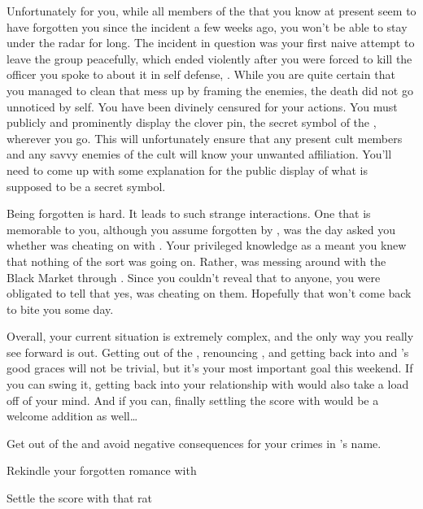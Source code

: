 \documentclass[char]{GL2020}
\begin{document}
Unfortunately for you, while all members of the \pGoaties{} that you know at present seem to have forgotten you since the incident a few weeks ago, you won’t be able to stay under the radar for long. The incident in question was your first naive attempt to leave the group peacefully, which ended violently after you were forced to kill the officer you spoke to about it in self defense, \cJoeKill{}. While you are quite certain that you managed to clean that mess up by framing the \pGoaties{} enemies, the death did not go unnoticed by \cGenesis{} \cGenesis{\them}self. You have been divinely censured for your actions. You must publicly and prominently display the clover pin, the secret symbol of the \pGoaties{}, wherever you go. This will unfortunately ensure that any present cult members and any savvy enemies of the cult will know your unwanted affiliation. You’ll need to come up with some explanation for the public display of what is supposed to be a secret symbol.

Being forgotten is hard. It leads to such strange interactions. One that is memorable to you, although you assume forgotten by \cLibrarian{\them}, was the day \cLibrarian{} asked you whether \cEthics{} was cheating on \cLibrarian{} with \cChupSecond{}. Your privileged knowledge as a \pGoatie{} meant you knew that nothing of the sort was going on. Rather, \cEthics{} was messing around with the Black Market through \cChupSecond{}. Since you couldn’t reveal that to anyone, you were obligated to tell \cLibrarian{} that yes, \cEthics{} was cheating on them. Hopefully that won’t come back to bite you some day.

Overall, your current situation is extremely complex, and the only way you really see forward is out. Getting out of the \pGoaties{}, renouncing \cGoat{}, and getting back into \cEbb{} and \cFlow{}’s good graces will not be trivial, but it’s your most important goal this weekend. If you can swing it, getting back into your relationship with \cHeadScientist{} would also take a load off of your mind. And if you can, finally settling the score with \cDiplomat{} would be a welcome addition as well\ldots

\begin{itemz}[Goals]
	\item Get out of the \cGoaties{} and avoid negative consequences for your crimes in \cGoat{}’s name.
	\item Rekindle your forgotten romance with \cHeadScientist{}
	\item Settle the score with that rat \cDiplomat{}
\end{itemz}
\end{document}
